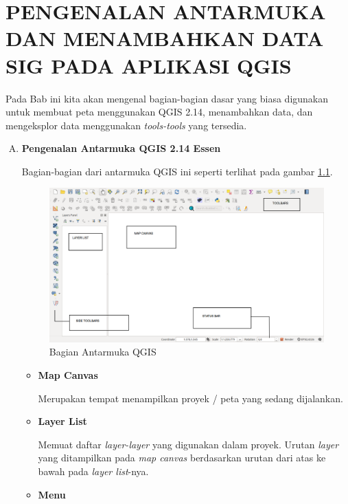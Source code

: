 \chapter{PENGENALAN ANTARMUKA DAN MENAMBAHKAN DATA SIG PADA APLIKASI QGIS}

Pada Bab ini kita akan mengenal bagian-bagian dasar yang biasa digunakan untuk membuat peta menggunakan QGIS 2.14, menambahkan data, dan mengeksplor data menggunakan \textit{tools-tools} yang tersedia.

\begin{enumerate}[A.]

\item \textbf{Pengenalan Antarmuka QGIS 2.14 Essen}

Bagian-bagian dari antarmuka QGIS ini seperti terlihat pada gambar \ref{fig:bagianui}.

\begin{figure}
  \centering
  \includegraphics[width=1\textwidth]{./resources/004-bagian-qgis}
  \caption{Bagian Antarmuka QGIS}
  \label{fig:bagianui}
\end{figure}

\begin{itemize}

\item \textbf{Map Canvas}

Merupakan tempat menampilkan proyek / peta yang sedang dijalankan.

\item \textbf{Layer List}

Memuat daftar \textit{layer-layer} yang digunakan dalam proyek. Urutan \textit{layer} yang ditampilkan pada \textit{map canvas} berdasarkan urutan dari atas ke bawah pada \textit{layer list}-nya.

\item \textbf{Menu}


\end{itemize}
\end{enumerate}
